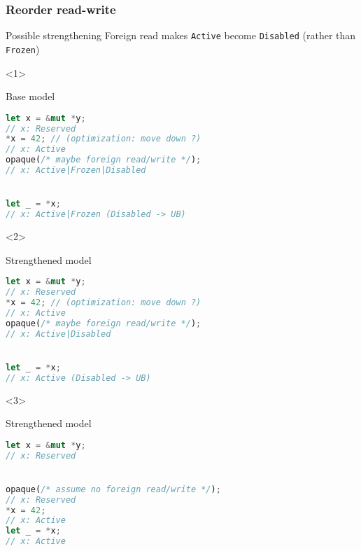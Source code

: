 \begin{frame}[fragile, t]
    \frametitle{Reorder read-write}
    \begin{exampleblock}{Possible strengthening}
        Foreign read makes \texttt{Active} become \texttt{Disabled}
        (rather than \texttt{Frozen})
    \end{exampleblock}


    \begin{onlyenv}<1>
        \begin{block}{{\xmark} Base model}
            \begin{lstlisting}[language=rust, basicstyle=\ttfamily\scriptsize]
let x = &mut *y;
// x: Reserved
*x = 42; // (optimization: move down ?)
// x: Active
opaque(/* maybe foreign read/write */);
// x: Active|Frozen|Disabled


let _ = *x;
// x: Active|Frozen (Disabled -> UB)
            \end{lstlisting}
        \end{block}
    \end{onlyenv}

    \begin{onlyenv}<2>
        \begin{block}{{\cmark} Strengthened model}
            \begin{lstlisting}[language=rust, basicstyle=\ttfamily\scriptsize]
let x = &mut *y;
// x: Reserved
*x = 42; // (optimization: move down ?)
// x: Active
opaque(/* maybe foreign read/write */);
// x: Active|Disabled


let _ = *x;
// x: Active (Disabled -> UB)
            \end{lstlisting}
        \end{block}
    \end{onlyenv}

    \begin{onlyenv}<3>
        \begin{block}{{\cmark} Strengthened model}
            \begin{lstlisting}[language=rust, basicstyle=\ttfamily\scriptsize]
let x = &mut *y;
// x: Reserved


opaque(/* assume no foreign read/write */);
// x: Reserved
*x = 42;
// x: Active
let _ = *x;
// x: Active
            \end{lstlisting}
        \end{block}
    \end{onlyenv}



\end{frame}
